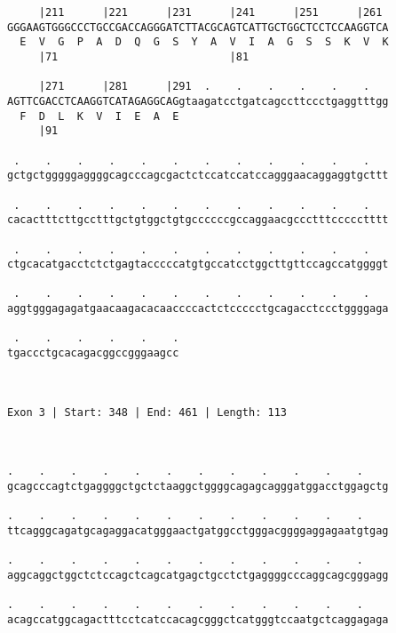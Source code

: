 \documentclass{article}
\begin{document}
\begin{Verbatim}
     |211      |221      |231      |241      |251      |261 
GGGAAGTGGGCCCTGCCGACCAGGGATCTTACGCAGTCATTGCTGGCTCCTCCAAGGTCA
  E  V  G  P  A  D  Q  G  S  Y  A  V  I  A  G  S  S  K  V  K
     |71                           |81                      
  
     |271      |281      |291  .    .    .    .    .    .   
AGTTCGACCTCAAGGTCATAGAGGCAGgtaagatcctgatcagccttccctgaggtttgg
  F  D  L  K  V  I  E  A  E                                 
     |91                                                    
  
 .    .    .    .    .    .    .    .    .    .    .    .   
gctgctgggggaggggcagcccagcgactctccatccatccagggaacaggaggtgcttt
                                                            
 .    .    .    .    .    .    .    .    .    .    .    .   
cacactttcttgcctttgctgtggctgtgccccccgccaggaacgccctttccccctttt
                                                            
 .    .    .    .    .    .    .    .    .    .    .    .   
ctgcacatgacctctctgagtacccccatgtgccatcctggcttgttccagccatggggt
                                                            
 .    .    .    .    .    .    .    .    .    .    .    .   
aggtgggagagatgaacaagacacaaccccactctccccctgcagacctccctggggaga
                                                            
 .    .    .    .    .    .
tgaccctgcacagacggccgggaagcc
                           
                           
 
Exon 3 | Start: 348 | End: 461 | Length: 113



.    .    .    .    .    .    .    .    .    .    .    .    
gcagcccagtctgaggggctgctctaaggctggggcagagcagggatggacctggagctg
                                                            
.    .    .    .    .    .    .    .    .    .    .    .    
ttcagggcagatgcagaggacatgggaactgatggcctgggacggggaggagaatgtgag
                                                            
.    .    .    .    .    .    .    .    .    .    .    .    
aggcaggctggctctccagctcagcatgagctgcctctgaggggcccaggcagcgggagg
                                                            
.    .    .    .    .    .    .    .    .    .    .    .    
acagccatggcagactttcctcatccacagcgggctcatgggtccaatgctcaggagaga
                                                            

\end{Verbatim}
\end{document}
